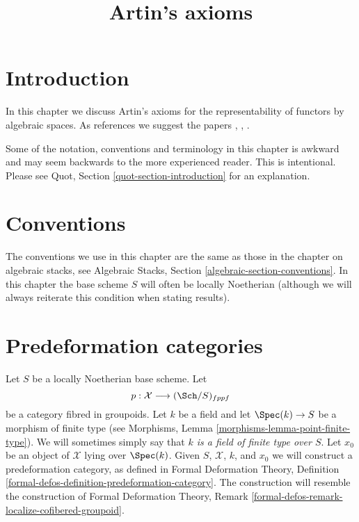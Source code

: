 

%


\title{Artin's axioms}

\maketitle

\label{section-phantom}

\tableofcontents




\section{Introduction}
\label{section-introduction}

\noindent
In this chapter we discuss Artin's axioms for the representability of
functors by algebraic spaces. As references we suggest the papers
\cite{ArtinI}, \cite{ArtinII}, \cite{ArtinVersal}.

\medskip\noindent
Some of the notation, conventions and terminology in this chapter is awkward
and may seem backwards to the more experienced reader. This is intentional.
Please see Quot, Section \ref{quot-section-introduction} for an
explanation.






\section{Conventions}
\label{section-conventions}

\noindent
The conventions we use in this chapter are the same as those in the
chapter on algebraic stacks, see
Algebraic Stacks, Section \ref{algebraic-section-conventions}.
In this chapter the base scheme $S$ will often be locally Noetherian
(although we will always reiterate this condition when stating
results).





\section{Predeformation categories}
\label{section-predeformation-categories}

\noindent
Let $S$ be a locally Noetherian base scheme. Let
$$
p : \mathcal{X} \longrightarrow (\Sch/S)_{fppf}
$$
be a category fibred in groupoids. Let $k$ be a field
and let $\Spec(k) \to S$ be a morphism of finite type (see
Morphisms, Lemma \ref{morphisms-lemma-point-finite-type}). We will sometimes
simply say that {\it $k$ is a field of finite type over $S$}. Let
$x_0$ be an object of $\mathcal{X}$ lying over $\Spec(k)$.
Given $S$, $\mathcal{X}$, $k$, and $x_0$ we will construct a
predeformation category, as defined in
Formal Deformation Theory,
Definition \ref{formal-defos-definition-predeformation-category}.
The construction will resemble the construction of
Formal Deformation Theory,
Remark \ref{formal-defos-remark-localize-cofibered-groupoid}.

